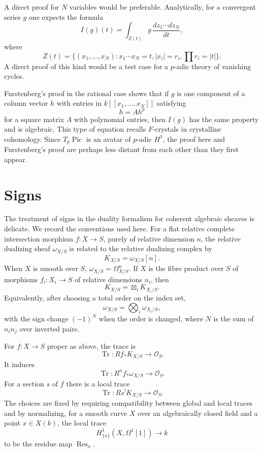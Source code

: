 \documentclass[11pt]{article}
\theoremstyle{remark}
\DeclareMathOperator{\Pic}{Pic}
\DeclareMathOperator{\Res}{Res}
\newcommand{\OO}{\mathcal O}
\DeclareMathOperator{\Tr}{Tr}
\begin{document}
A direct proof for $N$ variables would be preferable. Analytically, for a convergent series $g$ one expects the formula
\begin{equation}\tag{1'}
 I(g)(t)=\int_{Z(t)}g\,\frac{dz_1\cdots dz_N}{dt},
\end{equation}
where
\[
 Z(t)=\{(x_1,\ldots,x_N):x_1\cdots x_N=t,
 |x_i|=r_i,
 \prod r_i=|t|\}.
\]
A direct proof of this kind would be a test case for a $p$-adic theory of vanishing cycles.

Furstenberg's proof in the rational case shows that if $g$ is one component of a column vector $h$ with entries in $k[[x_1,\ldots,x_N]]$ satisfying
\[
 h=A h^p
\]
for a square matrix $A$ with polynomial entries, then $I(g)$ has the same property and is algebraic. This type of equation recalls $F$-crystals in crystalline cohomology. Since $T_p\Pic$ is an avatar of $p$-adic $H^1$, the proof here and Furstenberg's proof are perhaps less distant from each other than they first appear.

\appendix
\section{Signs}

The treatment of signs in the duality formalism for coherent algebraic sheaves is delicate. We record the conventions used here. For a flat relative complete intersection morphism $f:X\to S$, purely of relative dimension $n$, the relative dualizing sheaf $\omega_{X/S}$ is related to the relative dualizing complex by
\begin{equation}\tag{S.1}
 K_{X/S}=\omega_{X/S}[n].
\end{equation}
When $X$ is smooth over $S$, $\omega_{X/S}=\Omega^n_{X/S}$. If $X$ is the fibre product over $S$ of morphisms $f_i:X_i\to S$ of relative dimensions $n_i$, then
\begin{equation}\tag{S.2}
 K_{X/S}=\boxtimes_i K_{X_i/S}.
\end{equation}
Equivalently, after choosing a total order on the index set,
\begin{equation}\tag{S.3}
 \omega_{X/S}=\bigotimes_i\omega_{X_i/S},
\end{equation}
with the sign change $(-1)^N$ when the order is changed, where $N$ is the sum of $n_in_j$ over inverted pairs.

For $f:X\to S$ proper as above, the trace is
\begin{equation}\tag{S.4}
 \Tr:Rf_*K_{X/S}\to\OO_S.
\end{equation}
It induces
\begin{equation}\tag{S.5}
 \Tr:R^nf_*\omega_{X/S}\to\OO_S.
\end{equation}
For a section $s$ of $f$ there is a local trace
\begin{equation}\tag{S.6}
 \Tr:Rs^!K_{X/S}\to\OO_S.
\end{equation}
The choices are fixed by requiring compatibility between global and local traces and by normalizing, for a smooth curve $X$ over an algebraically closed field and a point $x\in X(k)$, the local trace
\begin{equation}\tag{S.7}
 H^1_{\{x\}}(X,\Omega^1[1])\to k
\end{equation}
to be the residue map $\Res_x$.
\end{document}
